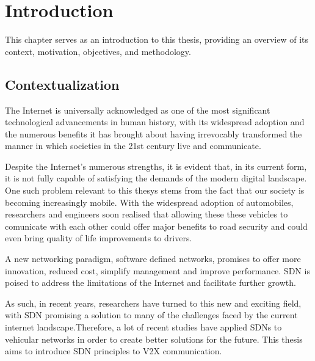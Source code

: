 
%

\chapter{Introduction}
\label{cha:introduction}

This chapter serves as an introduction to this thesis, providing an overview of its context, motivation, objectives, and methodology.

\section{Contextualization} %
\label{sec:contex}

The Internet is universally acknowledged as one of the most significant technological advancements in human history, with its widespread adoption and the numerous benefits it has brought about having irrevocably transformed the manner in which societies in the 21st century live and communicate. 

Despite the Internet's numerous strengths, it is evident that, in its current form, it is not fully capable of satisfying the demands of the modern digital landscape. One such problem relevant to this thesys stems from the fact that our society is becoming increasingly mobile. With the widespread adoption of automobiles, researchers and engineers soon realised that allowing these these vehicles to comunicate with each other could offer major benefits to road security and could even bring quality of life improvements to drivers. %

A new networking paradigm, software defined networks, promises to offer more innovation, reduced cost, simplify management and improve performance. SDN is poised to address the limitations of the Internet and facilitate further growth.

As such, in recent years, researchers have turned to this new and exciting field, with SDN promising a solution to many of the challenges faced by the current internet landscape.Therefore, a lot of recent studies have applied SDNs to vehicular networks in order to create better solutions for the future.
This thesis aims to introduce SDN principles to V2X communication.

